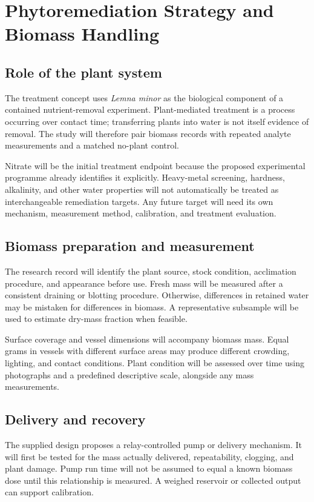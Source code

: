 \documentclass[12pt,a4paper]{article}
\newcommand{\papersection}[1]{\clearpage\section{#1}}
\begin{document}
\papersection{Phytoremediation Strategy and Biomass Handling}
\subsection{Role of the plant system}
The treatment concept uses \textit{Lemna minor} as the biological component of a contained nutrient-removal experiment. Plant-mediated treatment is a process occurring over contact time; transferring plants into water is not itself evidence of removal. The study will therefore pair biomass records with repeated analyte measurements and a matched no-plant control.

Nitrate will be the initial treatment endpoint because the proposed experimental programme already identifies it explicitly. Heavy-metal screening, hardness, alkalinity, and other water properties will not automatically be treated as interchangeable remediation targets. Any future target will need its own mechanism, measurement method, calibration, and treatment evaluation.

\subsection{Biomass preparation and measurement}
The research record will identify the plant source, stock condition, acclimation procedure, and appearance before use. Fresh mass will be measured after a consistent draining or blotting procedure. Otherwise, differences in retained water may be mistaken for differences in biomass. A representative subsample will be used to estimate dry-mass fraction when feasible.

Surface coverage and vessel dimensions will accompany biomass mass. Equal grams in vessels with different surface areas may produce different crowding, lighting, and contact conditions. Plant condition will be assessed over time using photographs and a predefined descriptive scale, alongside any mass measurements.

\subsection{Delivery and recovery}
The supplied design proposes a relay-controlled pump or delivery mechanism. It will first be tested for the mass actually delivered, repeatability, clogging, and plant damage. Pump run time will not be assumed to equal a known biomass dose until this relationship is measured. A weighed reservoir or collected output can support calibration.
\end{document}
